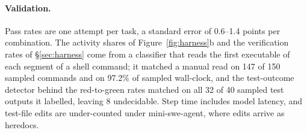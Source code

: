 \begin{table}[t]
\centering\footnotesize
\setlength{\tabcolsep}{3pt}
\caption{Paired scaffold comparisons within a model on the same 642 tasks: tasks solved only under scaffold $A$ / only under $B$, the difference in percentage points with its 95\% interval, and an exact test on the discordant tasks. ``mini'' is mini-swe-agent.}
\label{tab:pairs}
\end{table}

\paragraph{Validation.} Pass rates are one attempt per task, a standard error of 0.6--1.4 points per combination. The activity shares of Figure~\ref{fig:harness}b and the verification rates of \S\ref{sec:harness} come from a classifier that reads the first executable of each segment of a shell command; it matched a manual read on 147 of 150 sampled commands and on 97.2\% of sampled wall-clock, and the test-outcome detector behind the red-to-green rates matched on all 32 of 40 sampled test outputs it labelled, leaving 8 undecidable. Step time includes model latency, and test-file edits are under-counted under mini-swe-agent, where edits arrive as heredocs.

